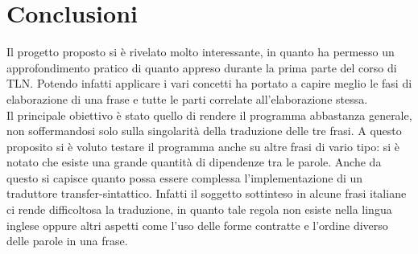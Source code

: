 \chapter{Conclusioni}
Il progetto proposto si è rivelato molto interessante, in quanto ha permesso un approfondimento pratico di quanto appreso durante la prima parte del corso di TLN. Potendo infatti applicare i vari concetti ha portato a capire meglio le fasi di elaborazione di una frase e tutte le parti correlate all'elaborazione stessa.\\
Il principale obiettivo è stato quello di rendere il programma abbastanza generale, non soffermandosi solo sulla singolarità della traduzione delle tre frasi. A questo proposito si è voluto testare il programma anche su altre frasi di vario tipo: si è notato che esiste una grande quantità di dipendenze tra le parole. Anche da questo si capisce quanto possa essere complessa l’implementazione di un traduttore transfer-sintattico. Infatti il soggetto sottinteso in alcune frasi italiane ci rende difficoltosa la traduzione, in quanto tale regola non esiste nella lingua inglese oppure altri aspetti come l'uso delle forme contratte e l'ordine diverso delle parole in una frase. 
